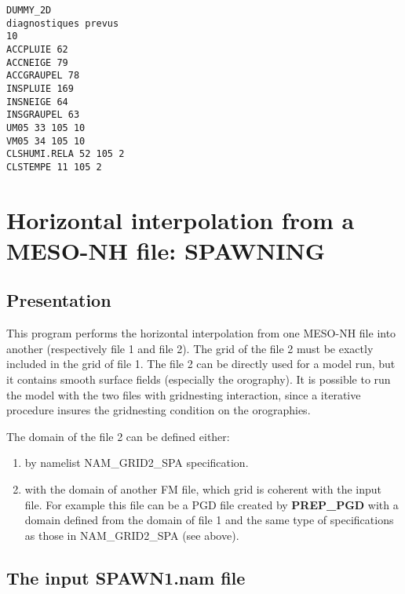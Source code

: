 \begin{verbatim}
DUMMY_2D
diagnostiques prevus
10
ACCPLUIE 62
ACCNEIGE 79
ACCGRAUPEL 78
INSPLUIE 169
INSNEIGE 64
INSGRAUPEL 63
UM05 33 105 10
VM05 34 105 10
CLSHUMI.RELA 52 105 2
CLSTEMPE 11 105 2
\end{verbatim}


\clearpage
\chapter{Horizontal interpolation from a MESO-NH file: {\bf SPAWNING}} \label{c:SPAWNING}
\label{s:spawn}
\section{Presentation}
This program performs the horizontal interpolation from one MESO-NH file
into another (respectively file 1 and file 2).
The grid of the file 2 must be exactly included in
the grid of file 1. The file 2 can be directly used
for a model run, but it contains smooth surface fields (especially the orography).
It is possible to run the model with
the two files with gridnesting interaction, since a iterative procedure
insures the gridnesting condition on the orographies.

The domain of the file 2 can be defined either:
\begin{enumerate}
\item by namelist NAM\_GRID2\_SPA specification.
\item with the domain of another FM file, which grid is coherent with the
input file. For example this file can be a PGD file created by {\bf
PREP\_PGD} with a domain defined from the domain of file 1 and the same
type of specifications as those in NAM\_GRID2\_SPA (see above).
\end{enumerate}



\section{The input SPAWN1.nam file}

